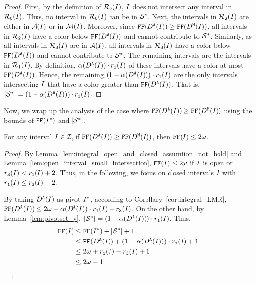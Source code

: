 {\begin{proof}
    First, by the definition of $\mathcal{R}_\texttt{0}(I)$, $I$ does not intersect any interval in $\mathcal{R}_\texttt{0}(I)$.
    Thus, no interval in $\mathcal{R}_\texttt{0}(I)$ can be in $\mathcal{S}^*$.
    Next, the intervals in $\mathcal{R}_\texttt{2}(I)$ are either in $\mathcal{A}(I)$ or in $\mathcal{M}(I)$.
    Moreover, since $\text{\texttt{FF}}(D^\texttt{A}(I)) \geq \text{\texttt{FF}}(D^\texttt{M}(I))$, all intervals in $\mathcal{R}_\texttt{2}(I)$ have a color below $\text{\texttt{FF}}(D^\texttt{A}(I))$ and cannot contribute to $\mathcal{S}^*$.
    Similarly, as all intervals in $\mathcal{R}_\texttt{3}(I)$ are in $\mathcal{A}(I)$, all intervals in $\mathcal{R}_\texttt{3}(I)$ have a color below $\text{\texttt{FF}}(D^\texttt{A}(I))$ and cannot contribute to $\mathcal{S}^*$.
    The remaining intervals are the intervals in $\mathcal{R}_\texttt{1}(I)$.
    By definition, $\alpha(D^\texttt{A}(I)) \cdot r_\texttt{1}(I)$ of these intervals have a color at most $\text{\texttt{FF}}(D^\texttt{A}(I))$.
    Hence, the remaining $(1 - \alpha(D^\texttt{A}(I)) ) \cdot r_\texttt{1}(I)$ are the only intervals intersecting $I$ that have a color greater than $\text{\texttt{FF}}(D^\texttt{A}(I))$. That is, $|\mathcal{S}^*| = (1 - \alpha(D^\texttt{A}(I))) \cdot r_\texttt{1}(I)$.
\end{proof}

\medskip

Now, we wrap up the analysis of the case where $\text{\texttt{FF}}(D^\texttt{A}(I)) \geq \text{\texttt{FF}}(D^\texttt{M}(I))$ using the bounds of $\text{\texttt{FF}}(I^*)$ and $|\mathcal{S}^*|$.

\begin{lemma}
    \fullversion{\label{lem:c_u>=c_z}}
    For any interval $I \in \mathcal{I}$, if $\text{\texttt{FF}}(D^\texttt{A}(I)) \geq \text{\texttt{FF}}(D^\texttt{M}(I))$, then $\text{\texttt{FF}}(I) \leq 2\omega$.
\end{lemma}

\begin{proof}
    By Lemma~\ref{lem:integral_open_and_closed_assumtion_not_hold} and Lemma~\ref{lem:open_interval_small_intersection}, $\text{\texttt{FF}}(I) \leq 2\omega$ if $I$ is open or $r_\texttt{3}(I) < r_\texttt{1}(I) + 2$.
    Thus, in the following, we focus on closed intervals $I$ with $r_\texttt{1}(I) \leq r_\texttt{3}(I) - 2$.
    
    By taking $D^\texttt{A}(I)$ as pivot $I^*$, according to Corollary~\ref{cor:integral_LMR}, $\text{\texttt{FF}}(D^\texttt{A}(I)) \leq 2\omega + \alpha(D^\texttt{A}(I)) \cdot r_\texttt{1}(I) - r_\texttt{3}(I)$.
    On the other hand, by  Lemma~\ref{lem:pivotset_y}, $|\mathcal{S}^*| = (1 - \alpha(D^\texttt{A}(I))) \cdot r_\texttt{1}(I)$.
    Thus,
    \begin{align*}
        \text{\texttt{FF}}(I) &\leq \text{\texttt{FF}}(I^*) + |\mathcal{S}^*| + 1\\
        &\leq \text{\texttt{FF}}(D^\texttt{A}(I)) + (1 - \alpha(D^\texttt{A}(I)) ) \cdot r_\texttt{1}(I) + 1\\
        &\leq 2\omega + r_\texttt{1}(I) - r_\texttt{3}(I) + 1\\
        &\leq 2\omega - 1
    \end{align*}
\end{proof}

}
